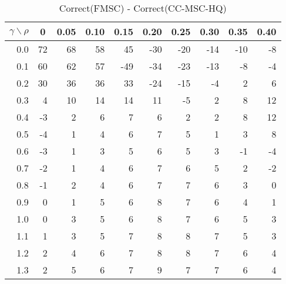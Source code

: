 \documentclass[12pt]{article}
\begin{document}
%
\begin{table}[!tbp]
\caption{Correct(FMSC) - Correct(CC-MSC-HQ)}
 \begin{center}
 \begin{tabular}{r|rrrrrrrrr}\hline\hline
\multicolumn{1}{c|}{$\gamma\backslash\rho$}&\multicolumn{1}{c}{0}&\multicolumn{1}{c}{0.05}&\multicolumn{1}{c}{0.10}&\multicolumn{1}{c}{0.15}&\multicolumn{1}{c}{0.20}&\multicolumn{1}{c}{0.25}&\multicolumn{1}{c}{0.30}&\multicolumn{1}{c}{0.35}&\multicolumn{1}{c}{0.40}\tabularnewline
\hline



0.0&72&68&58& 45&-30&-20&-14&-10&-8\tabularnewline
0.1&60&62&57&-49&-34&-23&-13& -8&-4\tabularnewline
0.2&30&36&36& 33&-24&-15& -4&  2& 6\tabularnewline
0.3& 4&10&14& 14& 11& -5&  2&  8&12\tabularnewline
0.4&-3& 2& 6&  7&  6&  2&  2&  8&12\tabularnewline
0.5&-4& 1& 4&  6&  7&  5&  1&  3& 8\tabularnewline
0.6&-3& 1& 3&  5&  6&  5&  3& -1&-4\tabularnewline
0.7&-2& 1& 4&  6&  7&  6&  5&  2&-2\tabularnewline
0.8&-1& 2& 4&  6&  7&  7&  6&  3& 0\tabularnewline
0.9& 0& 1& 5&  6&  8&  7&  6&  4& 1\tabularnewline
1.0& 0& 3& 5&  6&  8&  7&  6&  5& 3\tabularnewline
1.1& 1& 3& 5&  7&  8&  8&  7&  5& 3\tabularnewline
1.2& 2& 4& 6&  7&  8&  8&  7&  6& 4\tabularnewline
1.3& 2& 5& 6&  7&  9&  7&  7&  6& 4\tabularnewline
\hline
\end{tabular}

\end{center}

\end{table}
\end{document}

